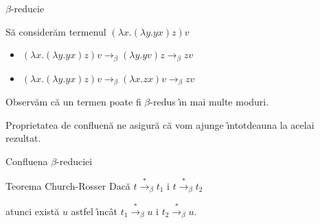 \documentclass[xcolor=pdftex,romanian,colorlinks]{beamer}
\newcommand{\ra}{\rightarrow}
\newcommand{\sra}{\stackrel{*}{\rightarrow}}
\begin{document}
\begin{frame}{$\beta$-reduc\ts ie}


S\u a consider\u am termenul $(\lambda x.(\lambda y.yx)z)v$

\medskip

\begin{itemize}
\item $(\lambda x.(\lambda y.yx)z)v\ra_\beta (\lambda y.yv)z\ra_\beta zv$

\pause\medskip

\item $(\lambda x.(\lambda y.yx)z)v\ra_\beta (\lambda x. zx)v \ra_\beta zv$

\end{itemize}

\pause \medskip

Observ\u am  c\u a un termen poate fi $\beta$-redus \^{\i}n mai multe moduri. 
\medskip 

Proprietatea de confluen\ts\u a ne asigur\u a c\u a vom ajunge \^{\i}ntotdeauna la acela\sh i rezultat.

\end{frame}


\begin{frame}[fragile]{Confluen\ts a $\beta$-reduc\ts iei}
\vspace*{0.3cm}


\begin{block}{Teorema Church-Rosser}
Dac\u a $t\sra_\beta t_1$ \sh i $t\sra_\beta t_2$ 


\begin{figure}[h]
  \centering
\end{figure}

\pause

atunci exist\u a $u$ astfel \^{\i}nc\^ at $t_1\sra_\beta u$ \sh i $t_2\sra_\beta u$.

\begin{figure}[h]
  \centering
\end{figure} 
\end{block}
\end{frame}
\end{document}
